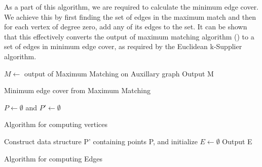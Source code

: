 \documentclass[12pt, a4paper]{article}
\begin{document}
As a part of this algorithm, we are required to calculate the minimum edge cover. We achieve this by first finding the set of edges in the maximum match and then for each vertex of degree zero, add any of its edges to the set. It can be shown that this effectively converts the output of maximum matching algorithm (\cite{MicaliVazirani}) to a set of edges in minimum edge cover, as required by the Euclidean k-Supplier algorithm.\\

\begin{algorithm}[H]
$M \gets$ output of Maximum Matching on Auxillary graph\;
 Output M\;
 \caption{Minimum edge cover from Maximum Matching\newline}
 \end{algorithm}
\begin{algorithm}[H]
 $P \gets \emptyset$ and $ P' \gets \emptyset$ \;
\caption{Algorithm for computing vertices\newline\newline}
\end{algorithm}

\begin{algorithm}[H]
 Construct data structure P' containing points P, and initialize $E \gets \emptyset$\;
 Output E\;
 \caption{Algorithm for computing Edges\newline\newline}
\end{algorithm}
\end{document}
